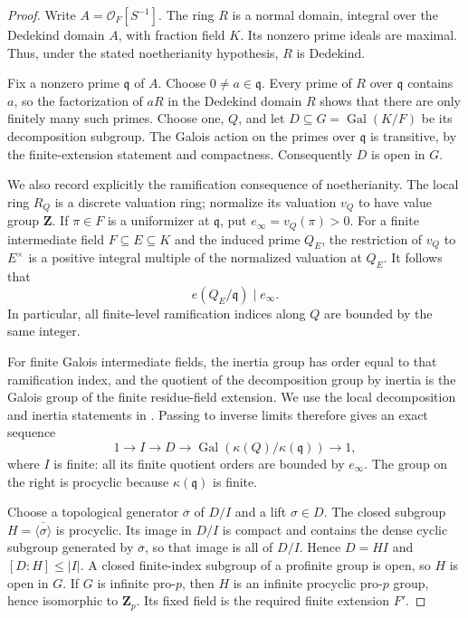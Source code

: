 \begin{proof}
Write $A=\mathcal O_F[S^{-1}]$.  The ring $R$ is a normal domain,
integral over the Dedekind domain $A$, with fraction field $K$.
Its nonzero prime ideals are maximal.  Thus, under the stated
noetherianity hypothesis, $R$ is Dedekind.

Fix a nonzero prime $\mathfrak q$ of $A$.  Choose
$0\ne a\in\mathfrak q$.  Every prime of $R$ over $\mathfrak q$
contains $a$, so the factorization of $aR$ in the Dedekind domain
$R$ shows that there are only finitely many such primes.  Choose
one, $Q$, and let $D\subseteq G=\operatorname{Gal}(K/F)$ be its
decomposition subgroup.  The Galois action on the primes over
$\mathfrak q$ is transitive, by the finite-extension statement
and compactness.  Consequently $D$ is open in $G$.

We also record explicitly the ramification consequence of
noetherianity.  The local ring $R_Q$ is a discrete valuation ring;
normalize its valuation $v_Q$ to have value group $\mathbf Z$.
If $\pi\in F$ is a uniformizer at $\mathfrak q$, put
$e_\infty=v_Q(\pi)>0$.  For a finite intermediate field
$F\subseteq E\subseteq K$ and the induced prime $Q_E$, the
restriction of $v_Q$ to $E^\times$ is a positive integral
multiple of the normalized valuation at $Q_E$.  It follows that
\[
                 e(Q_E/\mathfrak q)\mid e_\infty.
\]
In particular, all finite-level ramification indices along $Q$
are bounded by the same integer.

For finite Galois intermediate fields, the inertia group has
order equal to that ramification index, and the quotient of the
decomposition group by inertia is the Galois group of the finite
residue-field extension.  We use the local decomposition and
inertia statements in \cite[Theorem~7.58 and
Propositions~8.10--8.11, pp.~131, 139--140]{C_MilneANT2020}.
Passing to inverse limits therefore gives an exact sequence
\[
  1\longrightarrow I\longrightarrow D\longrightarrow
  \operatorname{Gal}(\kappa(Q)/\kappa(\mathfrak q))
  \longrightarrow1,
\]
where $I$ is finite: all its finite quotient orders are bounded
by $e_\infty$.  The group on the right is procyclic because
$\kappa(\mathfrak q)$ is finite.

Choose a topological generator $\overline\sigma$ of $D/I$ and
a lift $\sigma\in D$.  The closed subgroup
$H=\overline{\langle\sigma\rangle}$ is procyclic.  Its image
in $D/I$ is compact and contains the dense cyclic subgroup
generated by $\overline\sigma$, so that image is all of $D/I$.
Hence $D=HI$ and $[D:H]\le |I|$.  A closed finite-index
subgroup of a profinite group is open, so $H$ is open in $G$.
If $G$ is infinite pro-$p$, then $H$ is an infinite procyclic
pro-$p$ group, hence isomorphic to $\mathbf Z_p$.  Its fixed
field is the required finite extension $F'$.
\end{proof}

